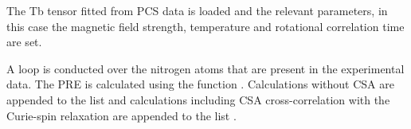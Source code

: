 \documentclass[a4paper,10pt,english]{sphinxmanual}
\begin{document}
%
\begin{sphinxVerbatim}[commandchars=\\\{\}]
     

  

  

  
\end{sphinxVerbatim}

The Tb tensor fitted from PCS data is loaded and the relevant parameters, in this case the magnetic field strength, temperature and rotational correlation time are set.

%
\begin{sphinxVerbatim}[commandchars=\\\{\}]
  
  
  
  
\end{sphinxVerbatim}

A loop is conducted over the nitrogen atoms that are present in the experimental data. The PRE is calculated using the function . Calculations without CSA are appended to the list  and calculations including CSA cross-correlation with the Curie-spin relaxation are appended to the list .
\end{document}
